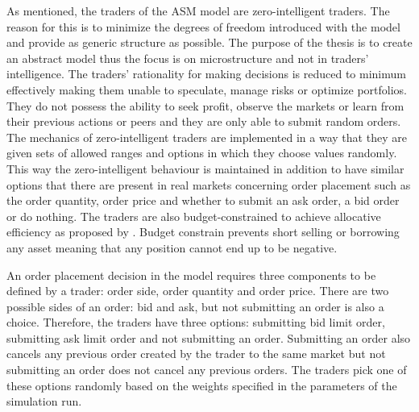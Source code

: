 As mentioned, the traders of the ASM model are zero-intelligent
traders. The reason for this is to minimize the degrees of freedom introduced with 
the model and provide as generic structure as possible. The purpose of the thesis is to 
create an abstract model thus the focus is on microstructure and not in traders' intelligence. The traders' rationality 
for making decisions is reduced to minimum effectively making them unable to speculate, 
manage risks or optimize portfolios. They do not possess the ability to seek profit, 
observe the markets or learn from their previous actions or peers and
they are only able to submit random orders. The mechanics of zero-intelligent traders
are implemented in a way that they are given sets of allowed ranges 
and options in which they choose values randomly. This way the zero-intelligent behaviour is maintained
in addition to have similar options that there are present in real markets 
concerning order placement such as the order quantity, order price and whether
to submit an ask order, a bid order or do nothing. The traders are also budget-constrained
to achieve allocative efficiency as proposed by
\citet{God93}. Budget constrain prevents short selling or borrowing any asset meaning that 
any position cannot end up to be negative.


An order placement decision in the model requires three components 
to be defined by a trader: order side, order quantity and order price. 
There are two possible sides of an order: bid and ask, but
not submitting an order is also a choice. Therefore, the traders
have three options: submitting bid limit order, submitting ask limit order
and not submitting an order. Submitting an order also cancels any previous
order created by the trader to the same market but not submitting an order does not
cancel any previous orders. The traders pick one of these options randomly 
based on the weights specified in the parameters of the simulation run. 

